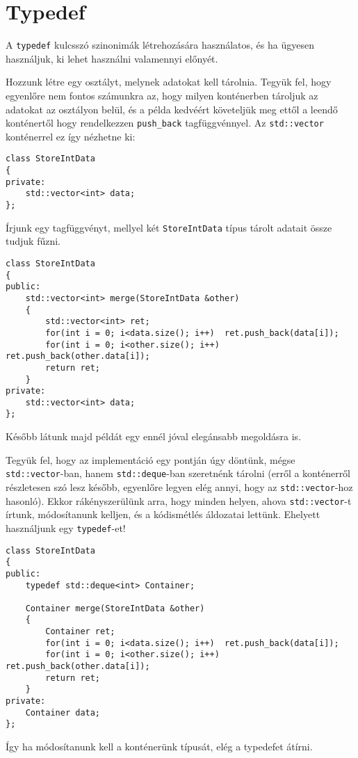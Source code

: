 \documentclass[../cpp_book/cpp_book.tex]{subfiles}
\begin{document}
	\section{Typedef}
	A \texttt{typedef} kulcsszó szinonimák létrehozására használatos, és ha ügyesen használjuk, ki lehet használni valamennyi előnyét. 
	
	\smallskip
	Hozzunk létre egy osztályt, melynek adatokat kell tárolnia. Tegyük fel, hogy egyenlőre nem fontos számunkra az, hogy milyen konténerben tároljuk az adatokat az osztályon belül, és a példa kedvéért követeljük meg ettől a leendő konténertől hogy rendelkezzen \texttt{push\_back} tagfüggvénnyel. Az \texttt{std::vector} konténerrel ez így nézhetne ki:
	\begin{lstlisting}
class StoreIntData
{
private:
	std::vector<int> data;
};
	\end{lstlisting}
	Írjunk egy tagfüggvényt, mellyel két \texttt{StoreIntData} típus tárolt adatait össze tudjuk fűzni.
	\begin{lstlisting}
class StoreIntData
{
public:
	std::vector<int> merge(StoreIntData &other)
	{
		std::vector<int> ret;
		for(int i = 0; i<data.size(); i++)  ret.push_back(data[i]);
		for(int i = 0; i<other.size(); i++) ret.push_back(other.data[i]);
		return ret;
	}
private:
	std::vector<int> data;
};
	\end{lstlisting}
	\begin{note}
		Később látunk majd példát egy ennél jóval elegánsabb megoldásra is.
	\end{note}
	Tegyük fel, hogy az implementáció egy pontján úgy döntünk, mégse \texttt{std::vector}-ban, hanem \texttt{std::deque}-ban szeretnénk tárolni (erről a konténerről részletesen szó lesz később, egyenlőre legyen elég annyi, hogy az \texttt{std::vector}-hoz hasonló). Ekkor rákényszerülünk arra, hogy minden helyen, ahova \texttt{std::vector}-t írtunk, módosítanunk kelljen, és a kódismétlés áldozatai lettünk. Ehelyett használjunk egy \texttt{typedef}-et!
	\begin{lstlisting}
class StoreIntData
{
public:
	typedef std::deque<int> Container;
	
	Container merge(StoreIntData &other)
	{
		Container ret;
		for(int i = 0; i<data.size(); i++)  ret.push_back(data[i]);
		for(int i = 0; i<other.size(); i++) ret.push_back(other.data[i]);
		return ret;
	}
private:
	Container data;
};
	\end{lstlisting}
	Így ha módosítanunk kell a konténerünk típusát, elég a typedefet átírni.
	\medskip
	
\end{document}
